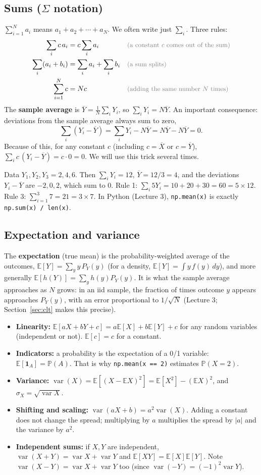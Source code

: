 \documentclass[11pt]{article}
\newcommand{\E}{\mathbb{E}}
\newcommand{\Var}{\operatorname{var}}
\renewcommand{\P}{\mathbb{P}}
\newcommand{\py}[1]{\texttt{#1}}
\newcommand{\Ybar}{\overline{Y}}
\newcommand{\Xbar}{\overline{X}}
\newcommand{\why}[1]{&&\text{\small\color{gray}(#1)}}
\begin{document}
\subsection{Sums ($\Sigma$ notation)}
$\sum_{i=1}^N a_i$ means $a_1+a_2+\cdots+a_N$. We often write just $\sum_i$. Three rules:
\begin{align*}
\sum_i c\,a_i &= c\sum_i a_i \why{a constant $c$ comes out of the sum}\\
\sum_i (a_i+b_i) &= \sum_i a_i+\sum_i b_i \why{a sum splits}\\
\sum_{i=1}^N c &= Nc \why{adding the same number $N$ times}
\end{align*}
The \textbf{sample average} is $\Ybar=\frac1N\sum_i Y_i$, so $\sum_i Y_i=N\Ybar$. An important consequence: deviations from the
sample average always sum to zero,
\[
\sum_i (Y_i-\Ybar)=\sum_i Y_i-N\Ybar=N\Ybar-N\Ybar=0 .
\]
Because of this, for any constant $c$ (including $c=\Xbar$ or $c=\Ybar$), $\sum_i c\,(Y_i-\Ybar)=c\cdot 0=0$. We will use this trick
several times.

\begin{examplebox}[title={Example}]
Data $Y_1,Y_2,Y_3=2,4,6$. Then $\sum_iY_i=12$, $\Ybar=12/3=4$, and the deviations $Y_i-\Ybar$ are $-2,0,2$, which sum to $0$.
Rule 1: $\sum_i 5Y_i=10+20+30=60=5\times12$. Rule 3: $\sum_{i=1}^3 7=21=3\times7$.
In Python (Lecture 3), \py{np.mean(x)} is exactly \py{np.sum(x) / len(x)}.
\end{examplebox}

\subsection{Expectation and variance}
The \textbf{expectation} (true mean) is the probability-weighted average of the outcomes,
$\E[Y]=\sum_y y\,P_Y(y)$ (for a density, $\E[Y]=\int y\,f(y)\,dy$), and more generally $\E[h(Y)]=\sum_y h(y)P_Y(y)$.
It is what the sample average approaches as $N$ grows: in an iid sample, the fraction of times outcome $y$ appears approaches $P_Y(y)$, with
an error proportional to $1/\sqrt N$ (Lecture 3; Section~\ref{sec:clt} makes this precise).
\begin{itemize}[leftmargin=*,itemsep=2pt]
\item \textbf{Linearity:} $\E[aX+bY+c]=a\E[X]+b\E[Y]+c$ for any random variables (independent or not). $\E[c]=c$ for a constant.
\item \textbf{Indicators:} a probability is the expectation of a 0/1 variable: $\E[\mathbf 1_A]=\P(A)$. That is why \py{np.mean(x == 2)}
estimates $\P(X=2)$.
\item \textbf{Variance:} $\Var(X)=\E[(X-\E X)^2]=\E[X^2]-(\E X)^2$, and $\sigma_X=\sqrt{\Var X}$.
\item \textbf{Shifting and scaling:} $\Var(aX+b)=a^2\Var(X)$. Adding a constant does not change the spread; multiplying by $a$
multiplies the spread by $|a|$ and the variance by $a^2$.
\item \textbf{Independent sums:} if $X,Y$ are independent, $\Var(X+Y)=\Var X+\Var Y$ and $\E[XY]=\E[X]\E[Y]$.
Note $\Var(X-Y)=\Var X+\Var Y$ too (since $\Var(-Y)=(-1)^2\Var Y$).
\end{itemize}
\end{document}
